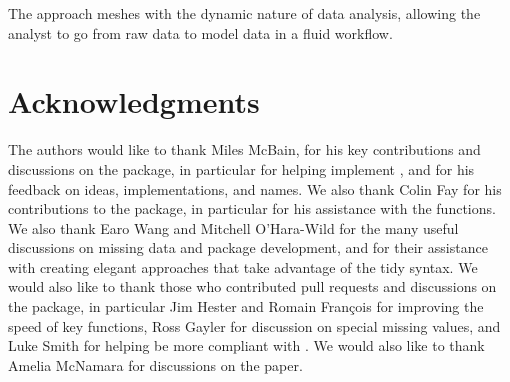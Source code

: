 \documentclass[article]{jss}
\begin{document}
The approach meshes with the dynamic nature of data analysis, allowing the
analyst to go from raw data to model data in a fluid workflow.

\hypertarget{acknowledgements}{%
\section*{Acknowledgments}\label{acknowledgements}}

The authors would like to thank Miles McBain, for his key contributions and
discussions on the  package, in particular for helping implement
, and for his feedback on ideas, implementations,
and names.  We also thank Colin Fay for his contributions to the
 package, in particular for his assistance with the
 functions.  We also thank Earo Wang and Mitchell
O'Hara-Wild for the many useful discussions on missing data and package
development, and for their assistance with creating elegant approaches that
take advantage of the tidy syntax.  We would also like to thank those who
contributed pull requests and discussions on the  package, in
particular Jim Hester and Romain Fran{\c{c}}ois for improving the speed of key
functions, Ross Gayler for discussion on special missing values, and Luke
Smith for helping  be more compliant with .  We
would also like to thank Amelia McNamara for discussions on the paper.


\end{document}
